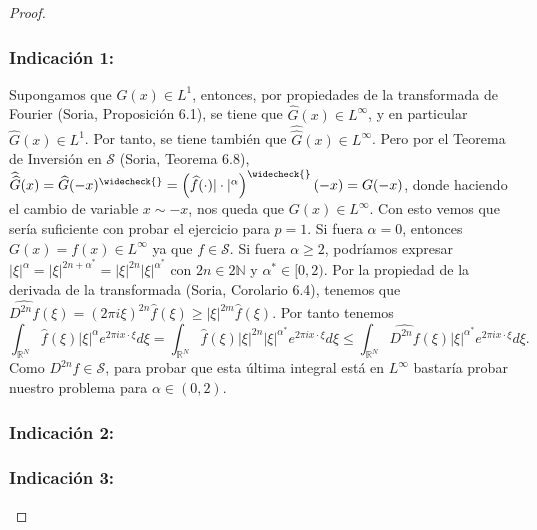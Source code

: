 \documentclass[11pt,a4paper]{article}
\begin{document}
\begin{proof}
    \
    \subsubsection*{Indicación 1:}
    Supongamos que $ G(x) \in L^1$, entonces, por propiedades de la transformada de Fourier (Soria, Proposición 6.1), se tiene que $ \widehat G(x) \in L^\infty $, y en particular $ \widehat G(x) \in L^1$. Por tanto, se tiene también que $ \widehat{\widehat G}(x) \in L^\infty$. Pero por el Teorema de Inversión en $\mathscr{S}$ (Soria, Teorema 6.8), $ \widehat{\widehat G} (x) = \widehat G(-x)^{\widecheck{}} = \left(\widehat f(\cdot)|\cdot|^\alpha\right)^{\widecheck{}}(-x) = G(-x)$, donde haciendo el cambio de variable $ x \sim -x $, nos queda que $ G(x) \in L^\infty $. Con esto vemos que sería suficiente con probar el ejercicio para $ p = 1 $.
    \vskip 5mm
    Si fuera $ \alpha = 0 $, entonces $ G(x) = f(x) \in L^\infty $ ya que $ f \in \mathscr S$. Si fuera $ \alpha \ge 2 $, podríamos expresar $ |\xi|^\alpha = |\xi|^{2n + \alpha^*} = |\xi|^{2n} |\xi|^{\alpha^*}$ con $ 2n \in 2\mathbb N $ y $\alpha^* \in [0, 2)$. Por la propiedad de la derivada de la transformada (Soria, Corolario 6.4), tenemos que $ \widehat{D^{2n}f}(\xi) = (2 \pi i \xi)^{2n} \widehat f (\xi) \ge |\xi|^{2m} \widehat f (\xi)$. Por tanto tenemos
    $$
    \int_{\mathbb R^N}
    \widehat f(\xi)|\xi|^\alpha e^{2\pi ix\cdot\xi}d\xi = \int_{\mathbb R^N}
    \widehat f(\xi) |\xi|^{2n} |\xi|^{\alpha^*} e^{2\pi ix\cdot\xi}d\xi \le \int_{\mathbb R^N}
    \widehat{D^{2n}f}(\xi) |\xi|^{\alpha^*} e^{2\pi ix\cdot\xi}d\xi.
    $$
    Como $ D^{2n}f \in \mathscr S $, para probar que esta última integral está en $ L^\infty $ bastaría probar nuestro problema para $ \alpha \in (0, 2)$. 

    \newpage

    \subsubsection*{Indicación 2:}
    

    \subsubsection*{Indicación 3:}
\end{proof}
\end{document}
